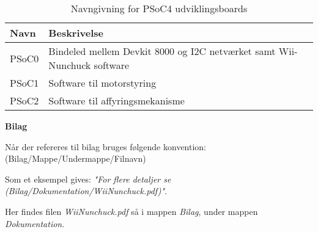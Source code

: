\begin{table}[H]
	\centering
	\begin{tabular}{|l|l|}
		\hline
		\textbf{Navn} & \textbf{Beskrivelse}                                                    \\ \hline
		PSoC0         & Bindeled mellem Devkit 8000 og I2C netværket samt Wii-Nunchuck software \\ \hline
		PSoC1         & Software til motorstyring \\ \hline
		PSoC2         & Software til affyringsmekanisme                                         \\ \hline
	\end{tabular}
	\caption{Navngivning for PSoC4 udviklingsboards}
	\label{PSoCNavngivning}
\end{table}

\noindent \textbf{Bilag} \newline

\noindent Når der refereres til bilag bruges følgende konvention: \newline
\noindent (Bilag/Mappe/Undermappe/Filnavn) \newline

\noindent Som et eksempel gives: \newline
\noindent \textit{"For flere detaljer se (Bilag/Dokumentation/WiiNunchuck.pdf)"}. \newline

\noindent Her findes filen \textit{WiiNunchuck.pdf} så i mappen \textit{Bilag}, under mappen \textit{Dokumentation}.


